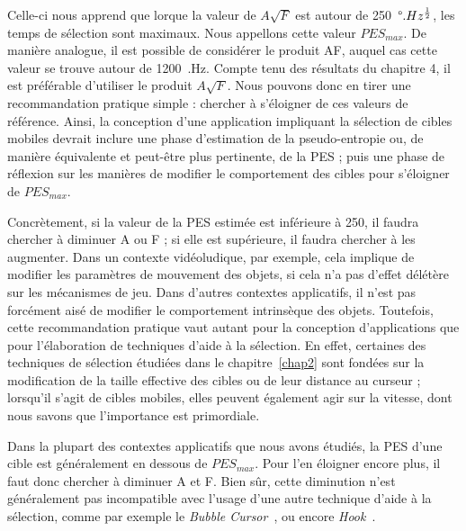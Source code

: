 	Celle-ci nous apprend que lorque la valeur de $A\sqrt{F}$ est autour de 250~$\degree{}.Hz^{\frac{1}{2}}$, les temps de sélection sont maximaux. Nous appellons cette valeur $PES_{max}$. De manière analogue, il est possible de considérer le produit AF, auquel cas cette valeur se trouve autour de 1200~\textdegree{}.Hz. Compte tenu des résultats du chapitre 4, il est préférable d'utiliser le produit $A\sqrt{F}$. Nous pouvons donc en tirer une recommandation pratique simple : chercher à s'éloigner de ces valeurs de référence. Ainsi, la conception d'une application impliquant la sélection de cibles mobiles devrait inclure une phase d'estimation de la pseudo-entropie ou, de manière équivalente et peut-être plus pertinente, de la PES ; puis une phase de réflexion sur les manières de modifier le comportement des cibles pour s'éloigner de $PES_{max}$.
	
	Concrètement, si la valeur de la PES estimée est inférieure à 250, il faudra chercher à diminuer A ou F ; si elle est supérieure, il faudra chercher à les augmenter. Dans un contexte vidéoludique, par exemple, cela implique de modifier les paramètres de mouvement des objets, si cela n'a pas d'effet délétère sur les mécanismes de jeu. Dans d'autres contextes applicatifs, il n'est pas forcément aisé de modifier le comportement intrinsèque des objets. Toutefois, cette recommandation pratique vaut autant pour la conception d'applications que pour l'élaboration de techniques d'aide à la sélection. En effet, certaines des techniques de sélection étudiées dans le chapitre~\ref{chap2} sont fondées sur la modification de la taille effective des cibles ou de leur distance au curseur ; lorsqu'il s'agit de cibles mobiles, elles peuvent également agir sur la vitesse, dont nous savons que l'importance est primordiale.
	
	Dans la plupart des contextes applicatifs que nous avons étudiés, la PES d'une cible est généralement en dessous de $PES_{max}$. Pour l'en éloigner encore plus, il faut donc chercher à diminuer A et F. Bien sûr, cette diminution n'est généralement pas incompatible avec l'usage d'une autre technique d'aide à la sélection, comme par exemple le \emph{Bubble Cursor}~\cite{grossman2005bubble}, ou encore \emph{Hook}~\cite{ortega2013hook}.
	
